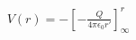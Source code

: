 \documentclass[preview]{standalone}
\begin{document}
\begin{align*}
V(r) = -\left[-\frac{Q}{4\pi \epsilon_0 r'}\right]_{\infty}^{r}
\end{align*}
\end{document}
